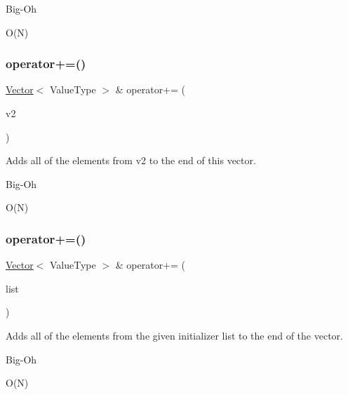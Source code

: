 \begin{DoxyRefDesc}{Big-\/\+Oh}
\item[\mbox{\hyperlink{BigOh__BigOh000142}{Big-\/\+Oh}}]O(\+N) \end{DoxyRefDesc}
\mbox{\label{classVector_a6b35f98e0e64a2fff6891a8806f640fd}} 
\subsubsection{\texorpdfstring{operator+=()}{operator+=()}\hspace{0.1cm}{\footnotesize\ttfamily [1/3]}}
{\footnotesize\ttfamily \mbox{\hyperlink{classVector}{Vector}}$<$ Value\+Type $>$ \& operator+= (\begin{DoxyParamCaption}\item[{const \mbox{\hyperlink{classVector}{Vector}}$<$ Value\+Type $>$ \&}]{v2 }\end{DoxyParamCaption})}



Adds all of the elements from {\ttfamily v2} to the end of this vector. 

\begin{DoxyRefDesc}{Big-\/\+Oh}
\item[\mbox{\hyperlink{BigOh__BigOh000143}{Big-\/\+Oh}}]O(\+N) \end{DoxyRefDesc}
\mbox{\label{classVector_a22e55ed53bfa2da64ecd22b36757fcea}} 
\subsubsection{\texorpdfstring{operator+=()}{operator+=()}\hspace{0.1cm}{\footnotesize\ttfamily [2/3]}}
{\footnotesize\ttfamily \mbox{\hyperlink{classVector}{Vector}}$<$ Value\+Type $>$ \& operator+= (\begin{DoxyParamCaption}\item[{std\+::initializer\+\_\+list$<$ Value\+Type $>$}]{list }\end{DoxyParamCaption})}



Adds all of the elements from the given initializer list to the end of the vector. 

\begin{DoxyRefDesc}{Big-\/\+Oh}
\item[\mbox{\hyperlink{BigOh__BigOh000144}{Big-\/\+Oh}}]O(\+N) \end{DoxyRefDesc}
\mbox{\label{classVector_afded71b2a6d6df8b0257cbfd8f7e8d5f}} 
